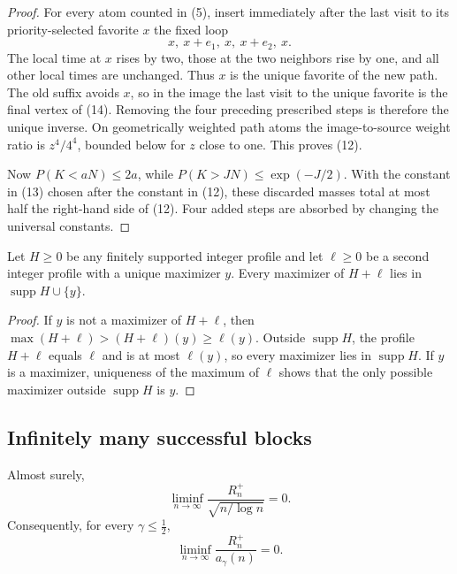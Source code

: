 \begin{proof}
For every atom counted in (5), insert immediately after the last visit to
its priority-selected favorite \(x\) the fixed loop
\begin{equation}
x,\ x+e_1,\ x,\ x+e_2,\ x.                             \tag{14}
\end{equation}
The local time at \(x\) rises by two, those at the two neighbors rise by
one, and all other local times are unchanged.  Thus \(x\) is the unique
favorite of the new path.  The old suffix avoids \(x\), so in the image the
last visit to the unique favorite is the final vertex of (14).  Removing
the four preceding prescribed steps is therefore the unique inverse.  On
geometrically weighted path atoms the image-to-source weight ratio is
\(z^4/4^4\), bounded below for \(z\) close to one.  This proves (12).

Now \(P(K<aN)\le2a\), while
\(P(K>JN)\le\exp(-J/2)\).  With the constant in (13) chosen after the
constant in (12), these discarded masses total at most half the right-hand
side of (12).  Four added steps are absorbed by changing the universal
constants.
\end{proof}

\begin{lemma}\label{lem:inherited-profile-dichotomy}
Let \(H\ge0\) be any finitely supported integer profile and let
\(\ell\ge0\) be a second integer profile with a unique maximizer \(y\).
Every maximizer of \(H+\ell\) lies in
\(\operatorname{supp}H\cup\{y\}\).
\end{lemma}

\begin{proof}
If \(y\) is not a maximizer of \(H+\ell\), then
\(\max(H+\ell)>(H+\ell)(y)\ge\ell(y)\).  Outside
\(\operatorname{supp}H\), the profile \(H+\ell\) equals \(\ell\) and is at
most \(\ell(y)\), so every maximizer lies in \(\operatorname{supp}H\).
If \(y\) is a maximizer, uniqueness of the maximum of \(\ell\) shows that
the only possible maximizer outside \(\operatorname{supp}H\) is \(y\).
\end{proof}

\subsection{Infinitely many successful blocks}

\begin{proposition}\label{prop:critical-recurrence}
Almost surely,
\begin{equation}
\liminf_{n\to\infty}
       \frac{R_n^+}{\sqrt{n/\log n}}=0.                        \tag{15}
\end{equation}
Consequently, for every \(\gamma\le\tfrac12\),
\begin{equation}
\liminf_{n\to\infty}\frac{R_n^+}{a_\gamma(n)}=0.
                                                                    \tag{16}
\end{equation}
\end{proposition}

